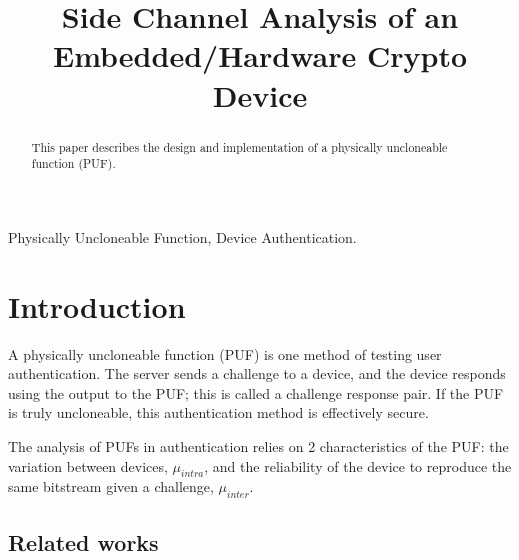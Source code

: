 
\usepackage{tikz}
\usepackage{verbatim}
\usepackage{listings}


\title{Side Channel Analysis of an Embedded/Hardware Crypto Device}

\author{
}

\maketitle


\begin{abstract}
%
This paper describes the design and implementation of a physically uncloneable function (PUF). 

 
\end{abstract}

\begin{IEEEkeywords}
Physically Uncloneable Function, Device Authentication.
\end{IEEEkeywords}

\section{Introduction}
	A physically uncloneable function (PUF) is one method of testing user authentication. The server sends a challenge to a device, and the device responds using the output to the PUF; this is called a challenge response pair. If the PUF is truly uncloneable, this authentication method is effectively secure. 

	The analysis of PUFs in authentication relies on 2 characteristics of the PUF: the variation between devices, $\mu_{intra}$, and the reliability of the device to reproduce the same bitstream given a challenge, $\mu_{inter}$. 

\subsection{Related works}
	\cite{Kumar2008}
